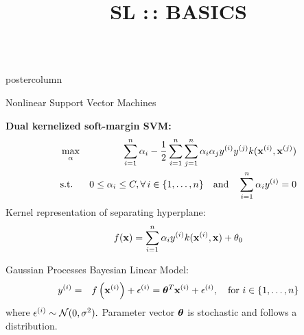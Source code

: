 \documentclass{beamer}
\title{SL :\,: BASICS} %
\newlength{\columnheight} %
\begin{document}
	\begin{frame}[fragile]{}
		\vspace{-8ex}
		\begin{columns}
			\begin{column}{.31\textwidth}
				\begin{beamercolorbox}[center]{postercolumn}
					\begin{minipage}{.98\textwidth}
						\parbox[t][\columnheight]{\textwidth}{
							\begin{myblock}{Nonlinear Support Vector Machines}
								
								\textbf{Dual kernelized soft-margin SVM:}
									\begin{eqnarray*}
										& \max_{\alpha} & \sum_{i=1}^n \alpha_i - \frac{1}{2}\sum_{i=1}^n\sum_{j=1}^n\alpha_i\alpha_jy^{(i)} y^{(j)} k(\mathbf{x}^{(i)}, \mathbf{x}^{(j)})  \\
										& \text{s.t. } & 0 \le \alpha_i \le C, \forall\, i \in \{1, \ldots, n\} \quad \text{and} \quad  \sum_{i=1}^n \alpha_i y^{(i)} = 0
									\end{eqnarray*}	
								Kernel representation of separating hyperplane:
									$$ f(\mathbf{x}) = \sum\limits_{i=1}^n \alpha_i y^{(i)} k(\mathbf{x}^{(i)}, \mathbf{x})  + \theta_0$$
							\end{myblock}
							\begin{myblock}{Gaussian Processes}
								Bayesian Linear Model:
								\begin{eqnarray*}
									y^{(i)} &=& f\left(\mathbf{x}^{(i)}\right) + \epsilon^{(i)} = \bm{\theta}^T \mathbf{x}^{(i)} + \epsilon^{(i)}, \quad \text{for } i \in \{1, \ldots, n\}
								\end{eqnarray*}
								where $\epsilon^{(i)} \sim \mathcal{N}(0, \sigma^2).$
								Parameter vector $\bm{\theta}$ is stochastic and follows a distribution.\\
								

\end{myblock}}
\end{minipage}
\end{beamercolorbox}
\end{column}
\end{columns}
\end{frame}
\end{document}
